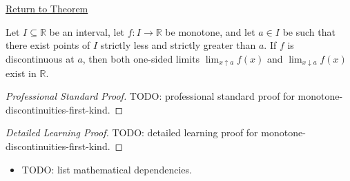 \newpage
{}
\label{prf:monotone-discontinuities-first-kind}

\begin{remark*}[Return]
\hyperref[prop:monotone-discontinuities-first-kind]{Return to Theorem}
\end{remark*}

\begin{proposition*}
Let $I \subseteq \mathbb{R}$ be an interval, let $f:I \to \mathbb{R}$ be monotone, and let $a \in I$ be such that there exist points of $I$ strictly less and strictly greater than $a$. If $f$ is discontinuous at $a$, then both one-sided limits $\lim_{x\uparrow a} f(x)$ and $\lim_{x\downarrow a} f(x)$ exist in $\mathbb{R}$.
\end{proposition*}

\begin{proof}[Professional Standard Proof]
\LRAProofBodyStart
TODO: professional standard proof for monotone-discontinuities-first-kind.
\end{proof}

\begin{proof}[Detailed Learning Proof]
\LRAProofBodyStart
TODO: detailed learning proof for monotone-discontinuities-first-kind.
\end{proof}

\begin{remark*}
\end{remark*}

\begin{dependencies}
\begin{itemize}
  \item TODO: list mathematical dependencies.
\end{itemize}
\end{dependencies}

\clearpage
